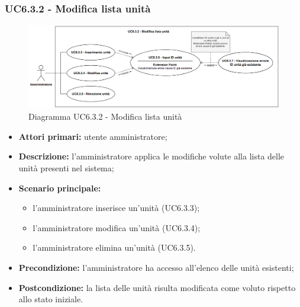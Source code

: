 \subsubsection{UC6.3.2 - Modifica lista unità}
	\begin{figure}[H]
		\centering
		\includegraphics[width=17cm]{images/UC6.3.2.png}
		\caption{Diagramma UC6.3.2 - Modifica lista unità}
	\end{figure}
	\begin{itemize}
		\item \textbf{Attori primari:} utente amministratore;
		\item \textbf{Descrizione:} l'amministratore applica le modifiche volute alla lista delle unità presenti nel sistema;
		\item \textbf{Scenario principale:} 
		\begin{itemize}
			\item l'amministratore inserisce un'unità (UC6.3.3);
			\item l'amministratore modifica un'unità (UC6.3.4);
			\item l'amministratore elimina un'unità (UC6.3.5).
		\end{itemize}
		\item \textbf{Precondizione:} l'amministratore ha accesso all'elenco delle unità esistenti;
		\item \textbf{Postcondizione:} la lista delle unità risulta modificata come voluto rispetto allo stato iniziale.
	\end{itemize}

